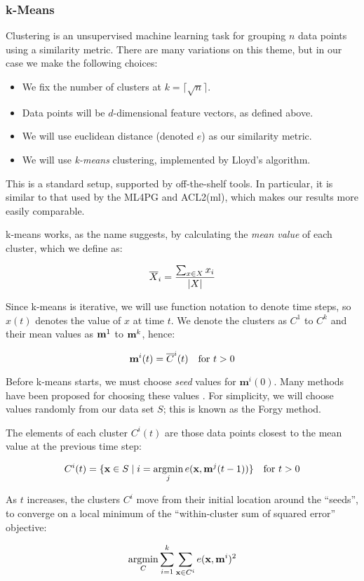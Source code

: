 \subsubsection{k-Means}
\label{sec:kmeans}

Clustering is an unsupervised machine learning task for grouping $n$ data points using a similarity metric. There are many variations on this theme, but in our case we make the following choices:

\begin{itemize}
  \item We fix the number of clusters at $k = \lceil \sqrt{n} \rceil$.
  \item Data points will be $d$-dimensional feature vectors, as defined above.
  \item We will use euclidean distance (denoted $e$) as our similarity metric.
  \item We will use \emph{k-means} clustering, implemented by Lloyd's algorithm.
\end{itemize}

This is a standard setup, supported by off-the-shelf tools. In particular, it is similar to that used by the ML4PG and ACL2(ml), which makes our results more easily comparable.

k-means works, as the name suggests, by calculating the \emph{mean value} of each cluster, which we define as:

\begin{equation*}
  \overline{X}_i = \frac{\sum_{x \in X} x_i}{|X|}
\end{equation*}

Since k-means is iterative, we will use function notation to denote time steps, so $x(t)$ denotes the value of $x$ at time $t$. We denote the clusters as $C^1$ to $C^k$ and their mean values as $\mathbf{m}^1$ to $\mathbf{m}^k$, hence:

\begin{equation*}
  \mathbf{m}^i(t) = \overline{C}^i(t) \quad \text{for $t > 0$}
\end{equation*}

Before k-means starts, we must choose \emph{seed} values for $\mathbf{m}^i(0)$. Many methods have been proposed for choosing these values \citep{arthur2007k}. For simplicity, we will choose values randomly from our data set $S$; this is known as the Forgy method.

The elements of each cluster $C^i(t)$ are those data points closest to the mean value at the previous time step:

\begin{equation*}
  C^i(t) = \{ \vect{x} \in S \mid i = \argmin\limits_j e(\vect{x}, \vect{m}^j(t-1)) \} \quad \text{for $t > 0$}
\end{equation*}

As $t$ increases, the clusters $C^i$ move from their initial location around the ``seeds'', to converge on a local minimum of the ``within-cluster sum of squared error'' objective:

\begin{equation*}
  \argmin\limits_C \sum_{i=1}^k \sum_{\vect{x} \in C^i} e(\vect{x}, \vect{m}^i)^2
\end{equation*}
